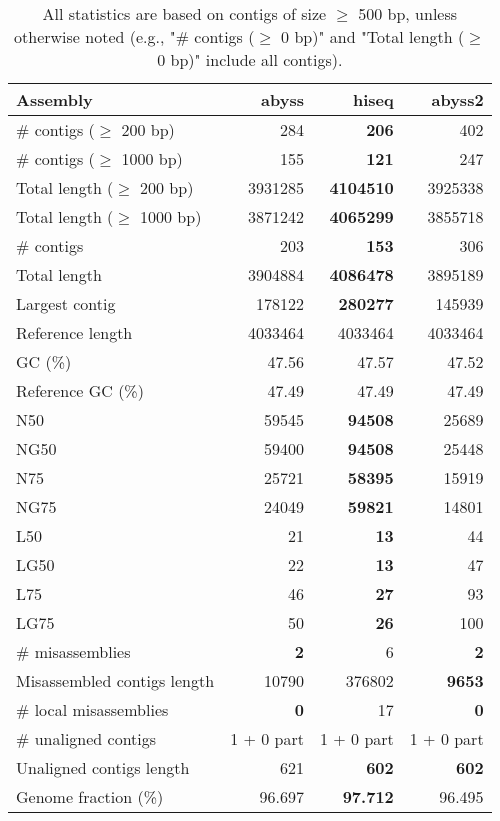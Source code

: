 \documentclass[12pt,a4paper]{article}
\begin{document}
\begin{table}[ht]
\begin{center}
\caption{All statistics are based on contigs of size $\geq$ 500 bp, unless otherwise noted (e.g., "\# contigs ($\geq$ 0 bp)" and "Total length ($\geq$ 0 bp)" include all contigs).}
\begin{tabular}{|l*{3}{|r}|}
\hline
Assembly & abyss & hiseq & abyss2 \\ \hline
\# contigs ($\geq$ 200 bp) & 284 & {\bf 206} & 402 \\ \hline
\# contigs ($\geq$ 1000 bp) & 155 & {\bf 121} & 247 \\ \hline
Total length ($\geq$ 200 bp) & 3931285 & {\bf 4104510} & 3925338 \\ \hline
Total length ($\geq$ 1000 bp) & 3871242 & {\bf 4065299} & 3855718 \\ \hline
\# contigs & 203 & {\bf 153} & 306 \\ \hline
Total length & 3904884 & {\bf 4086478} & 3895189 \\ \hline
Largest contig & 178122 & {\bf 280277} & 145939 \\ \hline
Reference length & 4033464 & 4033464 & 4033464 \\ \hline
GC (\%) & 47.56 & 47.57 & 47.52 \\ \hline
Reference GC (\%) & 47.49 & 47.49 & 47.49 \\ \hline
N50 & 59545 & {\bf 94508} & 25689 \\ \hline
NG50 & 59400 & {\bf 94508} & 25448 \\ \hline
N75 & 25721 & {\bf 58395} & 15919 \\ \hline
NG75 & 24049 & {\bf 59821} & 14801 \\ \hline
L50 & 21 & {\bf 13} & 44 \\ \hline
LG50 & 22 & {\bf 13} & 47 \\ \hline
L75 & 46 & {\bf 27} & 93 \\ \hline
LG75 & 50 & {\bf 26} & 100 \\ \hline
\# misassemblies & {\bf 2} & 6 & {\bf 2} \\ \hline
Misassembled contigs length & 10790 & 376802 & {\bf 9653} \\ \hline
\# local misassemblies & {\bf 0} & 17 & {\bf 0} \\ \hline
\# unaligned contigs & 1 + 0 part & 1 + 0 part & 1 + 0 part \\ \hline
Unaligned contigs length & 621 & {\bf 602} & {\bf 602} \\ \hline
Genome fraction (\%) & 96.697 & {\bf 97.712} & 96.495 \\ \hline

\end{tabular}
\end{center}
\end{table}
\end{document}
